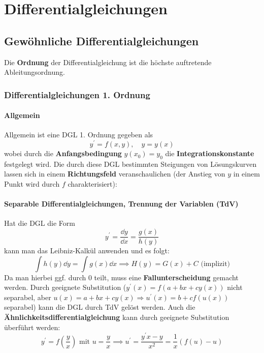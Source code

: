 \chapter{Differentialgleichungen}
\section{Gewöhnliche Differentialgleichungen}
Die \textbf{Ordnung} der Differentialgleichung ist die höchste auftretende Ableitungsordnung.
\subsection{Differentialgleichungen 1. Ordnung}
\subsubsection{Allgemein}
Allgemein ist eine DGL 1. Ordnung gegeben als
\begin{equation}
	y^{\prime}=f(x, y), \quad y=y(x)
\end{equation}
wobei durch die \textbf{Anfangsbedingung} $y\left(x_{0}\right)=y_{0}$ die \textbf{Integrationskonstante} festgelegt wird. Die durch diese DGL bestimmten Steigungen von Lösungskurven lassen sich in einem \textbf{Richtungsfeld} veranschaulichen (der Anstieg von $y$ in einem Punkt wird durch $f$ charakterisiert):
\begin{center}
	\resizebox{.3\textwidth}{!}{}
\end{center}
\subsubsection{Separable Differentialgleichungen, Trennung der Variablen (TdV)}
Hat die DGL die Form
\begin{equation}
	y^\prime=\frac{\dd y}{\dd x}=\frac{g(x)}{h(y)}
\end{equation}
kann man das Leibniz-Kalkül anwenden und es folgt:
\begin{equation}
	\int h(y) \dd y = \int g(x) \dd x \implies H(y)=G(x)+C \text{ (implizit)}
\end{equation}
Da man hierbei ggf. durch 0 teilt, muss eine \textbf{Fallunterscheidung} gemacht werden. Durch geeignete Substitution ($y^\prime(x)=f(a+bx+cy(x))$ nicht separabel, aber $u(x) = a+bx+cy(x)\Rightarrow u^\prime(x) = b+cf(u(x))$ separabel) kann die DGL durch TdV gelöst werden. Auch die \textbf{Ähnlichkeitsdifferentialgleichung} kann durch geeignete Substitution überführt werden:
\begin{equation}
	y^\prime=f\left(\frac{y}{x}\right) \text{ mit } u=\frac{y}{x}\implies u^\prime =\frac{y^\prime x-y}{x^2}=\frac{1}{x}\left(f(u)-u\right)
\end{equation}
